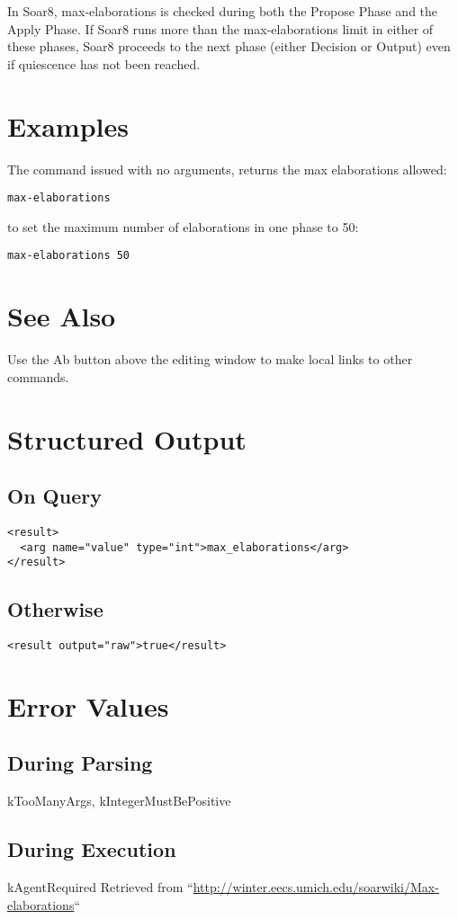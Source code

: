 \documentclass[10pt]{article}
\begin{document}
 In Soar8, max-elaborations is checked during both the Propose Phase and the Apply Phase. If Soar8 runs more than the max-elaborations limit in either of these phases, Soar8 proceeds to the next phase (either Decision or Output) even if quiescence has not been reached. 
\section*{ Examples }


 The command issued with no arguments, returns the max elaborations allowed: \begin{verbatim}
max-elaborations 

\end{verbatim}



 to set the maximum number of elaborations in one phase to 50: \begin{verbatim}
max-elaborations 50

\end{verbatim}

\section*{ See Also }


 Use the Ab button above the editing window to make local links to other commands. \\ 

\section*{ Structured Output }
\subsection*{ On Query }
\begin{verbatim}
<result>
  <arg name="value" type="int">max_elaborations</arg>
</result>

\end{verbatim}
\subsection*{ Otherwise }
\begin{verbatim}
<result output="raw">true</result>

\end{verbatim}
\section*{ Error Values }
\subsection*{ During Parsing }


 kTooManyArgs, kIntegerMustBePositive
\subsection*{ During Execution }


 kAgentRequired Retrieved from ``\url{http://winter.eecs.umich.edu/soarwiki/Max-elaborations}``
\end{document}
